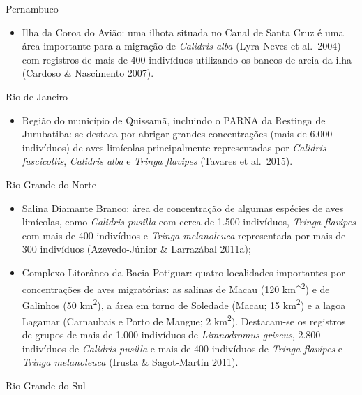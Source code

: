 \documentclass[
  oneside]{scrbook}
\providecommand{\tightlist}{%
  \setlength{\itemsep}{0pt}\setlength{\parskip}{0pt}}
\begin{document}
Pernambuco

\begin{itemize}
\tightlist
\item
  Ilha da Coroa do Avião: uma ilhota situada no Canal de Santa Cruz é uma área importante para a migração de \emph{Calidris alba} (Lyra-Neves et al.~2004) com registros de mais de 400 indivíduos utilizando os bancos de areia da ilha (Cardoso \& Nascimento 2007).
\end{itemize}

Rio de Janeiro

\begin{itemize}
\tightlist
\item
  Região do município de Quissamã, incluindo o PARNA da Restinga de Jurubatiba: se destaca por abrigar grandes concentrações (mais de 6.000 indivíduos) de aves limícolas principalmente representadas por \emph{Calidris fuscicollis}, \emph{Calidris alba} e \emph{Tringa flavipes} (Tavares et al.~2015).
\end{itemize}

Rio Grande do Norte

\begin{itemize}
\item
  Salina Diamante Branco: área de concentração de algumas espécies de aves limícolas, como \emph{Calidris pusilla} com cerca de 1.500 indivíduos, \emph{Tringa flavipes} com mais de 400 indivíduos e \emph{Tringa melanoleuca} representada por mais de 300 indivíduos (Azevedo-Júnior \& Larrazábal 2011a);
\item
  Complexo Litorâneo da Bacia Potiguar: quatro localidades importantes por concentrações de aves migratórias: as salinas de Macau (120 km\^{}\textsuperscript{2}) e de Galinhos (50 km\textsuperscript{2}), a área em torno de Soledade (Macau; 15 km\textsuperscript{2}) e a lagoa Lagamar (Carnaubais e Porto de Mangue; 2 km\textsuperscript{2}). Destacam-se os registros de grupos de mais de 1.000 indivíduos de \emph{Limnodromus griseus}, 2.800 indivíduos de \emph{Calidris pusilla} e mais de 400 indivíduos de \emph{Tringa flavipes} e \emph{Tringa melanoleuca} (Irusta \& Sagot-Martin 2011).
\end{itemize}

Rio Grande do Sul
\end{document}
